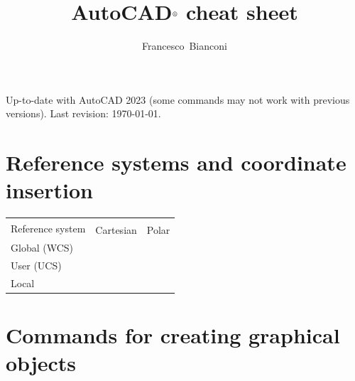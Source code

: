 \documentclass[..]{../IEEEphot}
\begin{document}
\title{AutoCAD$^{\text{\textregistered}}$ cheat sheet}

\author{Francesco~Bianconi}


\maketitle
%
%
\thispagestyle{empty}

\vspace{-1.0cm}
\noindent Up-to-date with AutoCAD 2023 (some commands may not work with previous versions). Last revision: \today.

\tableofcontents
	
\clearpage

\section{Reference systems and coordinate insertion}
\begin{longtable}{m{.3\linewidth}>{\centering\arraybackslash}p{.3\linewidth}>{\centering\arraybackslash}p{.3\linewidth}}
\toprule
\multirow{2}{*}{Reference system} & \multicolumn{2}{c}{Insertion mode} \\
\cmidrule{2-3}
 & Cartesian & Polar \\
\midrule
Global (WCS) & \multicolumn{1}{c}{*$x$,$y$} & \multicolumn{1}{c}{*$\rho<\theta$} \\
User (UCS) & \multicolumn{1}{c}{$x$,$y$} & \multicolumn{1}{c}{$\rho<\theta$} \\
Local & \multicolumn{1}{c}{@$x$,$y$} & \multicolumn{1}{c}{@$\rho<\theta$} \\
\bottomrule
\end{longtable}

\section{Commands for creating graphical objects}
\end{document}
